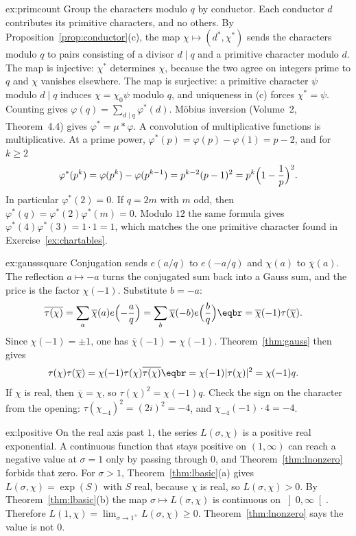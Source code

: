 \begin{solution}{ex:primcount}
\idea Group the characters modulo $q$ by conductor. Each conductor $d$ contributes its primitive characters, and no others.
\writeup By Proposition~\ref{prop:conductor}(c), the map $\chi\mapsto(d^*,\chi^*)$ sends the characters modulo $q$ to pairs consisting of a divisor $d\mid q$ and a primitive character modulo $d$. The map is injective: $\chi^*$ determines $\chi$, because the two agree on integers prime to $q$ and $\chi$ vanishes elsewhere. The map is surjective: a primitive character $\psi$ modulo $d\mid q$ induces $\chi=\chi_0\psi$ modulo $q$, and uniqueness in (c) forces $\chi^*=\psi$. Counting gives $\varphi(q)=\sum_{d\mid q}\varphi^*(d)$. Möbius inversion (Volume~2, Theorem~4.4) gives $\varphi^*=\mu*\varphi$. A convolution of multiplicative functions is multiplicative. At a prime power, $\varphi^*(p)=\varphi(p)-\varphi(1)=p-2$, and for $k\ge2$
\[
\varphi^*(p^k)=\varphi(p^k)-\varphi(p^{k-1})=p^{k-2}(p-1)^2=p^k\Bigl(1-\frac1p\Bigr)^2.
\]
In particular $\varphi^*(2)=0$. If $q=2m$ with $m$ odd, then $\varphi^*(q)=\varphi^*(2)\varphi^*(m)=0$. Modulo $12$ the same formula gives $\varphi^*(4)\varphi^*(3)=1\cdot1=1$, which matches the one primitive character found in Exercise~\ref{ex:chartables}.
\end{solution}

\begin{solution}{ex:gausssquare}
\idea Conjugation sends $e(a/q)$ to $e(-a/q)$ and $\chi(a)$ to $\overline\chi(a)$. The reflection $a\mapsto-a$ turns the conjugated sum back into a Gauss sum, and the price is the factor $\chi(-1)$.
\writeup Substitute $b=-a$:
\[
\begin{aligned}\overline{\tau(\chi)}&=\sum_a\overline\chi(a)e\Bigl(-\frac aq\Bigr)=\sum_b\overline\chi(-b)e\Bigl(\frac bq\Bigr)\eqbr=\overline\chi(-1)\tau(\overline\chi).\end{aligned}
\]
Since $\chi(-1)=\pm1$, one has $\overline\chi(-1)=\chi(-1)$. Theorem~\ref{thm:gauss} then gives
\[
\begin{aligned}\tau(\chi)\tau(\overline\chi)&=\chi(-1)\tau(\chi)\overline{\tau(\chi)}\eqbr=\chi(-1)|\tau(\chi)|^2=\chi(-1)q.\end{aligned}
\]
If $\chi$ is real, then $\overline\chi=\chi$, so $\tau(\chi)^2=\chi(-1)q$. Check the sign on the character from the opening: $\tau(\chi_{-4})^2=(2i)^2=-4$, and $\chi_{-4}(-1)\cdot4=-4$.
\end{solution}

\begin{solution}{ex:lpositive}
\idea On the real axis past $1$, the series $L(\sigma,\chi)$ is a positive real exponential. A continuous function that stays positive on $(1,\infty)$ can reach a negative value at $\sigma=1$ only by passing through $0$, and Theorem~\ref{thm:lnonzero} forbids that zero.
\writeup For $\sigma>1$, Theorem~\ref{thm:lbasic}(a) gives $L(\sigma,\chi)=\exp(S)$ with $S$ real, because $\chi$ is real, so $L(\sigma,\chi)>0$. By Theorem~\ref{thm:lbasic}(b) the map $\sigma\mapsto L(\sigma,\chi)$ is continuous on $\left]0,\infty\right[$. Therefore $L(1,\chi)=\lim_{\sigma\to1^+}L(\sigma,\chi)\ge0$. Theorem~\ref{thm:lnonzero} says the value is not $0$.
\end{solution}

